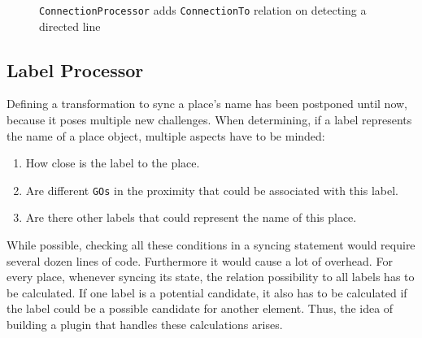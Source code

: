 \begin{figure}[ht]
  \centering
  
  \caption{\texttt{ConnectionProcessor} adds \texttt{ConnectionTo} relation on detecting a directed line}
  \label{fig:transition-plugin}
\end{figure}



\subsection{Label Processor}
Defining a transformation to sync a place's name has been postponed until now, because it poses multiple new challenges. When determining, if a label represents the name of a place object, multiple aspects have to be minded:
\begin{enumerate}
  \item How close is the label to the place.
  \item Are different \texttt{GOs} in the proximity that could be associated with this label.
  \item Are there other labels that could represent the name of this place.
\end{enumerate}

While possible, checking all these conditions in a syncing statement would require several dozen lines of code. Furthermore it would cause a lot of overhead. For every place, whenever syncing its state, the relation possibility to all labels has to be calculated. If one label is a potential candidate, it also has to be calculated if the label could be a possible candidate for another element. Thus, the idea of building a plugin that handles these calculations arises.


